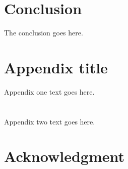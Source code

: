 \documentclass[journal]{IEEEtran/IEEEtran}
\begin{document}
%

\section{Conclusion}
The conclusion goes here.



\appendices
\section{Appendix title}
Appendix one text goes here.

\section{}
Appendix two text goes here.


\section*{Acknowledgment}
\end{document}

